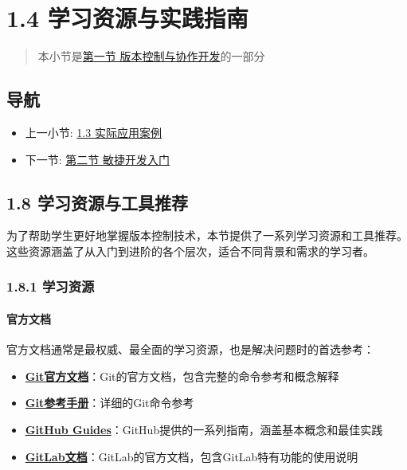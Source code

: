 \section{1.4
学习资源与实践指南}\label{ux5b66ux4e60ux8d44ux6e90ux4e0eux5b9eux8df5ux6307ux5357}

\begin{quote}
本小节是\href{section03-01.md}{第一节 版本控制与协作开发}的一部分
\end{quote}

\subsection{导航}\label{ux5bfcux822a}

\begin{itemize}
\tightlist
\item
  上一小节: \href{section03-01-03.md}{1.3 实际应用案例}
\item
  下一节: \href{section03-02.md}{第二节 敏捷开发入门}
\end{itemize}

\subsection{1.8
学习资源与工具推荐}\label{ux5b66ux4e60ux8d44ux6e90ux4e0eux5de5ux5177ux63a8ux8350}

为了帮助学生更好地掌握版本控制技术，本节提供了一系列学习资源和工具推荐。这些资源涵盖了从入门到进阶的各个层次，适合不同背景和需求的学习者。

\subsubsection{1.8.1 学习资源}\label{ux5b66ux4e60ux8d44ux6e90}

\paragraph{官方文档}\label{ux5b98ux65b9ux6587ux6863}

官方文档通常是最权威、最全面的学习资源，也是解决问题时的首选参考：

\begin{itemize}
\tightlist
\item
  \textbf{\href{https://git-scm.com/doc}{Git官方文档}}：Git的官方文档，包含完整的命令参考和概念解释
\item
  \textbf{\href{https://git-scm.com/docs}{Git参考手册}}：详细的Git命令参考
\item
  \textbf{\href{https://guides.github.com/}{GitHub
  Guides}}：GitHub提供的一系列指南，涵盖基本概念和最佳实践
\item
  \textbf{\href{https://docs.gitlab.com/}{GitLab文档}}：GitLab的官方文档，包含GitLab特有功能的使用说明
\end{itemize}

